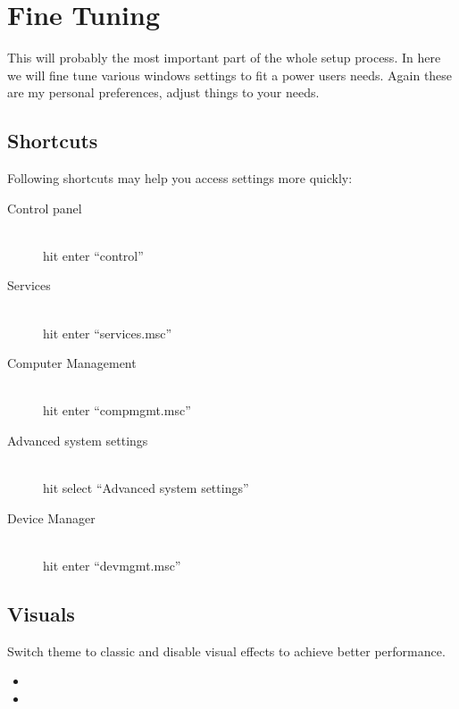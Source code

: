 \documentclass{itsarticle}
\begin{document}
\section{Fine Tuning}
\label{sec:fine_tuning}

This will probably the most important part of the whole setup process. In here
we will fine tune various windows settings to fit a power users needs. Again
these are my personal preferences, adjust things to your needs.

\subsection{Shortcuts}
\label{sub:shortcuts}

Following shortcuts may help you access settings more quickly:

\begin{description}
    \item[Control panel] \hfill \\
        hit  enter ``control''

    \item[Services] \hfill \\
        hit  enter ``services.msc''

    \item[Computer Management] \hfill \\
        hit  enter ``compmgmt.msc''

    \item[Advanced system settings] \hfill \\
        hit  select ``Advanced system settings''

    \item[Device Manager] \hfill \\
        hit  enter ``devmgmt.msc''
\end{description}

\subsection{Visuals}
\label{sub:visuals}

Switch theme to classic and disable visual effects to achieve better
performance.

\begin{itemize}
    \item {}
    \item {}
\end{itemize}
\end{document}

